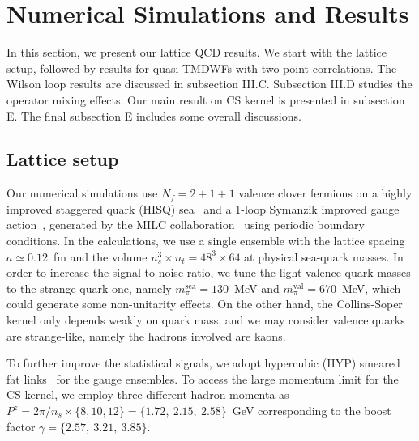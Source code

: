 \section{Numerical Simulations and Results}
\label{sec:numerics}

In this section, we present our lattice QCD results. We start with the lattice setup, followed by results
for quasi TMDWFs with two-point correlations. 
The Wilson loop results are discussed in subsection III.C. Subsection III.D studies the operator mixing effects. Our main result on CS kernel is presented in subsection E. The final subsection E includes some overall discussions. 

\subsection{Lattice setup }

Our numerical simulations use $N_f=2+1+1$ valence clover fermions on a  highly improved staggered quark (HISQ) sea~\cite{Follana:2006rc} and a 1-loop Symanzik improved gauge action~\cite{Symanzik:1983dc}, generated by the MILC collaboration~\cite{MILC:2012znn} using periodic boundary conditions. In the calculations, we use a single ensemble with the lattice spacing $a\simeq0.12$~fm and the volume $n_s^3\times n_t=48^3\times64$ at physical sea-quark masses. In order to increase the signal-to-noise ratio, we tune the light-valence quark masses to the strange-quark one, namely $m_{\pi}^{\mathrm{sea}}=130$~MeV and  $m_{\pi}^{\mathrm{val}}=670$~MeV, which
could generate some non-unitarity effects. On the other hand, the Collins-Soper kernel only depends weakly on quark mass, and we may consider valence quarks are strange-like, namely the hadrons involved are kaons.  

To further improve the statistical signals, we adopt hypercubic (HYP) smeared fat links~\cite{Hasenfratz:2001hp} for the gauge ensembles. To access the large momentum limit for the CS kernel, we employ three different hadron momenta as $P^z=2\pi/n_s\times\{8,10,12\}=\{1.72,~2.15,~2.58\}$~GeV  corresponding  to the boost factor $\gamma=\{2.57,~3.21,~3.85\}$. 



